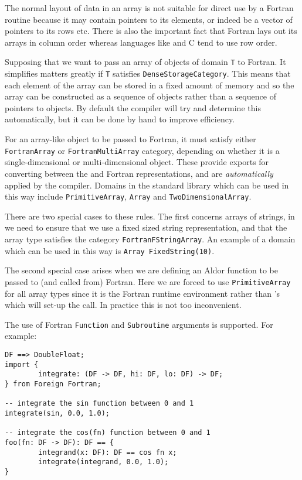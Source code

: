 
The normal layout of data in an \asharp{} array is not suitable for
direct use by a Fortran routine because it may contain pointers to 
its elements, or indeed be a vector of pointers to its rows etc.  There
is also the important fact that Fortran lays out its arrays in column
order whereas languages like \asharp{} and C tend to use row order.

Supposing that we want to pass an array of objects of domain {\tt T}
to Fortran.  It simplifies matters greatly if {\tt T} satisfies
\verb'DenseStorageCategory'.  This means that each element of the
array can be stored in a fixed amount of memory and so the array can
be constructed as a sequence of objects rather than a sequence of
pointers to objects.  By default the compiler will try and determine 
this automatically, but it can be done by hand to improve efficiency.

For an array-like object to be passed to Fortran, it must satisfy either
{\tt FortranArray} or {\tt FortranMultiArray} category, depending on
whether it is a single-dimensional or multi-dimensional object.  These
provide exports for converting between the \asharp{} and Fortran 
representations, and are {\em automatically\/} applied by the compiler.
Domains in the standard library which can be used in this way include
{\tt PrimitiveArray}, {\tt Array} and {\tt TwoDimensionalArray}.

There are two special cases to these rules.  The first concerns arrays
of strings, in \asharp{} we need to ensure that we use a fixed sized
string representation, and that the array type satisfies the category
{\tt Fortran\-F\-String\-Array}.  An example of a domain which can be used
in this way is {\tt Array Fixed\-String(10)}.

The second special case arises when we are defining an Aldor function
to be passed to (and called from) Fortran.  Here we are forced to use
{\tt PrimitiveArray} for all array types since it is the Fortran runtime
environment rather than \asharp{}'s which will set-up the call.  In
practice this is not too inconvenient.



The use of Fortran {\tt Function} and {\tt Subroutine} arguments is
supported.  For example:

\begin{verbatim}
DF ==> DoubleFloat;
import {
        integrate: (DF -> DF, hi: DF, lo: DF) -> DF;
} from Foreign Fortran;

-- integrate the sin function between 0 and 1
integrate(sin, 0.0, 1.0);

-- integrate the cos(fn) function between 0 and 1
foo(fn: DF -> DF): DF == {
        integrand(x: DF): DF == cos fn x;
        integrate(integrand, 0.0, 1.0);
}
\end{verbatim}

